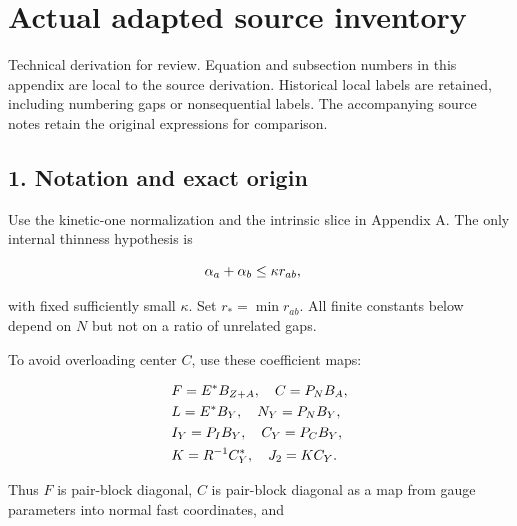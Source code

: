 \clearpage
\section{Actual adapted source
inventory}\label{d-actual-adapted-source-inventory}

Technical derivation for review. Equation and subsection numbers in this
appendix are local to the source derivation. Historical local labels are
retained, including numbering gaps or nonsequential labels. The
accompanying source notes retain the original expressions for
comparison.

\subsection{1. Notation and exact
origin}\label{d-notation-and-exact-origin}

Use the kinetic-one normalization and the intrinsic slice in Appendix A.
The only internal thinness hypothesis is

\begin{gather*}
\begin{aligned}
& \alpha _{a}+\alpha _{b} \le  \kappa  r_{ab},
\end{aligned}\notag
\end{gather*}

with fixed sufficiently small \(\kappa\). Set \(r_{*}=\min  r_{ab}\).
All finite constants below depend on \(N\) but not on a ratio of
unrelated gaps.

To avoid overloading center \(C\), use these coefficient maps:

\begin{gather*}
\begin{aligned}
& F = E^{*}B_{Z+A}, \quad  C = P_{N} B_{A}, \\
& L = E^{*}B_{Y}, \quad  N_{Y} = P_{N} B_{Y}, \\
& I_{Y} = P_{I} B_{Y}, \quad  C_{Y} = P_{C} B_{Y}, \\
& K = R^{-1} C_{Y}^{*}, \quad  J_{2} = K C_{Y}.
\end{aligned}\notag
\end{gather*}

Thus \(F\) is pair-block diagonal, \(C\) is pair-block diagonal as a map
from gauge parameters into normal fast coordinates, and

